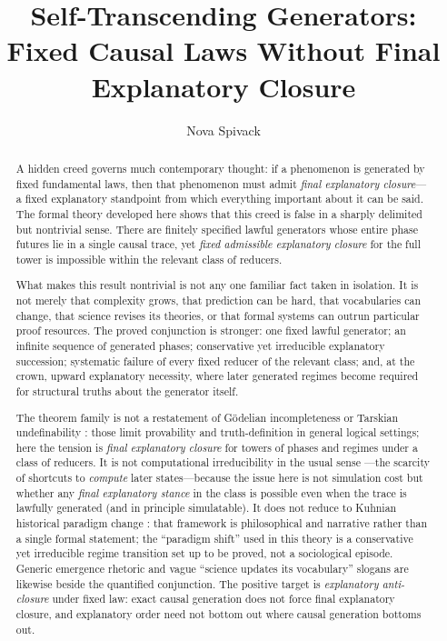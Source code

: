 \documentclass[11pt,a4paper]{article}
\title{\textbf{Self-Transcending Generators:}\\
Fixed Causal Laws Without Final Explanatory Closure}
\author{Nova Spivack}
\date{}
\theoremstyle{definition}
\begin{document}
\maketitle
\NovaZenodoAfterTitle

\begin{abstract}
\raggedright
\noindent
A hidden creed governs much contemporary thought: if a phenomenon is generated by fixed fundamental laws, then that phenomenon must admit \emph{final explanatory closure}---a fixed explanatory standpoint from which everything important about it can be said. The formal theory developed here shows that this creed is false in a sharply delimited but nontrivial sense. There are finitely specified lawful generators whose entire phase futures lie in a single causal trace, yet \emph{fixed admissible explanatory closure} for the full tower is impossible within the relevant class of reducers.

\smallskip
\noindent
What makes this result nontrivial is not any one familiar fact taken in isolation. It is not merely that complexity grows, that prediction can be hard, that vocabularies can change, that science revises its theories, or that formal systems can outrun particular proof resources. The proved conjunction is stronger: one fixed lawful generator; an infinite sequence of generated phases; conservative yet irreducible explanatory succession; systematic failure of every fixed reducer of the relevant class; and, at the crown, upward explanatory necessity, where later generated regimes become required for structural truths about the generator itself.

\smallskip
\noindent
The theorem family is not a restatement of Gödelian incompleteness or Tarskian undefinability \cite{Godel1931,Tarski1956}: those limit provability and truth-definition in general logical settings; here the tension is \emph{final explanatory closure} for towers of phases and regimes under a class of reducers. It is not computational irreducibility in the usual sense \cite{Wolfram2002}---the scarcity of shortcuts to \emph{compute} later states---because the issue here is not simulation cost but whether any \emph{final explanatory stance} in the class is possible even when the trace is lawfully generated (and in principle simulatable). It does not reduce to Kuhnian historical paradigm change \cite{Kuhn1970}: that framework is philosophical and narrative rather than a single formal statement; the ``paradigm shift'' used in this theory is a conservative yet irreducible regime transition set up to be proved, not a sociological episode. Generic emergence rhetoric and vague ``science updates its vocabulary'' slogans are likewise beside the quantified conjunction. The positive target is \emph{explanatory anti-closure} under fixed law: exact causal generation does not force final explanatory closure, and explanatory order need not bottom out where causal generation bottoms out.


\end{abstract}
\end{document}
